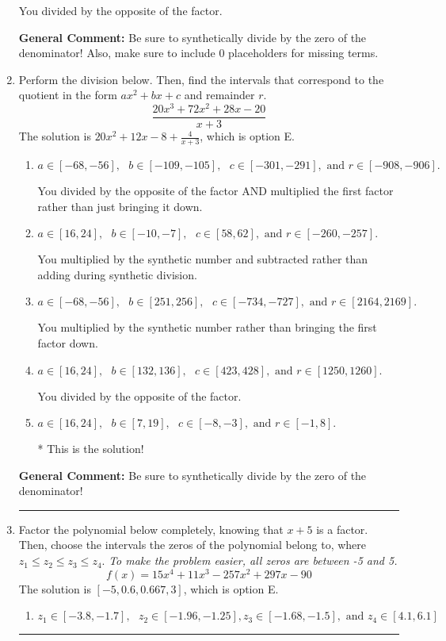\documentclass{extbook}[14pt]
\newcommand{\litem}[1]{\item #1

\rule{\textwidth}{0.4pt}}
\begin{document}
\begin{enumerate}
{\begin{enumerate}[label=\Alph*.]
 You divided by the opposite of the factor.
\end{enumerate}

\textbf{General Comment:} Be sure to synthetically divide by the zero of the denominator! Also, make sure to include 0 placeholders for missing terms.
}
\litem{
Perform the division below. Then, find the intervals that correspond to the quotient in the form $ax^2+bx+c$ and remainder $r$.
\[ \frac{20x^{3} +72 x^{2} +28 x -20}{x + 3} \]The solution is \( 20x^{2} +12 x -8 + \frac{4}{x + 3} \), which is option E.\begin{enumerate}[label=\Alph*.]
\item \( a \in [-68, -56], \text{   } b \in [-109, -105], \text{   } c \in [-301, -291], \text{   and   } r \in [-908, -906]. \)

 You divided by the opposite of the factor AND multiplied the first factor rather than just bringing it down.
\item \( a \in [16, 24], \text{   } b \in [-10, -7], \text{   } c \in [58, 62], \text{   and   } r \in [-260, -257]. \)

 You multiplied by the synthetic number and subtracted rather than adding during synthetic division.
\item \( a \in [-68, -56], \text{   } b \in [251, 256], \text{   } c \in [-734, -727], \text{   and   } r \in [2164, 2169]. \)

 You multiplied by the synthetic number rather than bringing the first factor down.
\item \( a \in [16, 24], \text{   } b \in [132, 136], \text{   } c \in [423, 428], \text{   and   } r \in [1250, 1260]. \)

 You divided by the opposite of the factor.
\item \( a \in [16, 24], \text{   } b \in [7, 19], \text{   } c \in [-8, -3], \text{   and   } r \in [-1, 8]. \)

* This is the solution!
\end{enumerate}

\textbf{General Comment:} Be sure to synthetically divide by the zero of the denominator!
}
\litem{
Factor the polynomial below completely, knowing that $x + 5$ is a factor. Then, choose the intervals the zeros of the polynomial belong to, where $z_1 \leq z_2 \leq z_3 \leq z_4$. \textit{To make the problem easier, all zeros are between -5 and 5.}
\[ f(x) = 15x^{4} +11 x^{3} -257 x^{2} +297 x -90 \]The solution is \( [-5, 0.6, 0.667, 3] \), which is option E.\begin{enumerate}[label=\Alph*.]
\item \( z_1 \in [-3.8, -1.7], \text{   }  z_2 \in [-1.96, -1.25], z_3 \in [-1.68, -1.5], \text{   and   } z_4 \in [4.1, 6.1] \)


\end{enumerate}}
\end{enumerate}
\end{document}
